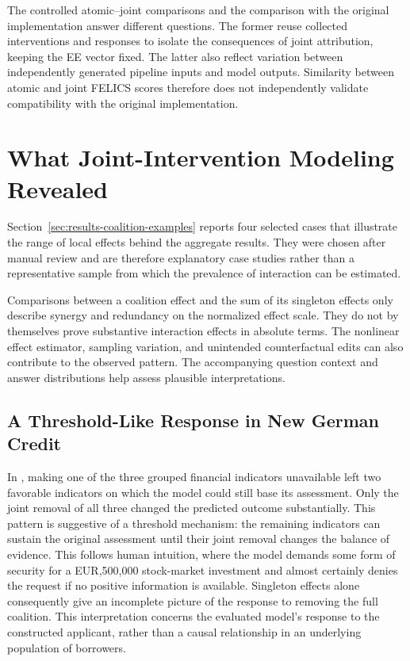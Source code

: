 The controlled atomic--joint comparisons and the comparison with the original implementation answer different questions. The former reuse collected interventions and responses to isolate the consequences of joint attribution, keeping the EE vector fixed. The latter also reflect variation between independently generated pipeline inputs and model outputs. Similarity between atomic and joint FELICS scores therefore does not independently validate compatibility with the original implementation.

\section{What Joint-Intervention Modeling Revealed}
\label{sec:joint_intervention_examples}

Section~\ref{sec:results-coalition-examples} reports four selected cases that illustrate the range of local effects behind the aggregate results. They were chosen after manual review and are therefore explanatory case studies rather than a representative sample from which the prevalence of interaction can be estimated.

Comparisons between a coalition effect and the sum of its singleton effects only describe synergy and redundancy on the normalized effect scale. They do not by themselves prove substantive interaction effects in absolute terms. The nonlinear effect estimator, sampling variation, and unintended counterfactual edits can also contribute to the observed pattern. The accompanying question context and answer distributions help assess plausible interpretations.

\subsection{A Threshold-Like Response in New German Credit}

In , making one of the three grouped financial indicators unavailable left two favorable indicators on which the model could still base its assessment. Only the joint removal of all three changed the predicted outcome substantially. This pattern is suggestive of a threshold mechanism: the remaining indicators can sustain the original assessment until their joint removal changes the balance of evidence. This follows human intuition, where the model demands some form of security for a EUR,500,000 stock-market investment and almost certainly denies the request if no positive information is available. Singleton effects alone consequently give an incomplete picture of the response to removing the full coalition. This interpretation concerns the evaluated model's response to the constructed applicant, rather than a causal relationship in an underlying population of borrowers.

